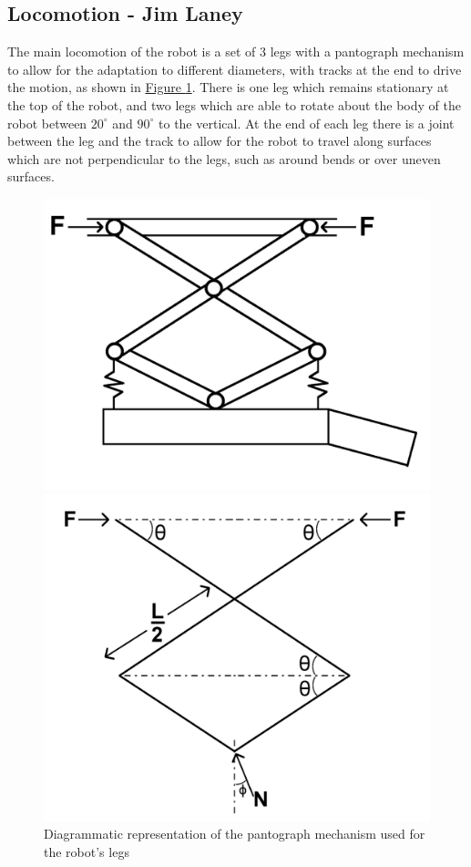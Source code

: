 \documentclass[11pt]{article}		%
\newlength{\imageheight}	 %
\newcommand{\figref}[1]{\hyperref[#1]{Figure \ref*{#1}}}    %
\begin{document}
		\subsection[Locomotion]{Locomotion - Jim Laney}
			The main locomotion of the robot is a set of 3 legs with a pantograph mechanism  to allow for the adaptation to different diameters, with tracks at the end to drive the motion, as shown in \figref{legDesign}.
			There is one leg which remains stationary at the top of the robot, and two legs which are able to rotate about the body of the robot between $20^\circ$ and $90^\circ$ to the vertical.
			At the end of each leg there is a joint between the leg and the track to allow for the robot to travel along surfaces which are not perpendicular to the legs, such as around bends or over uneven surfaces.
			\begin{figure}[h]
				\centering
				\begin{multicols}{2}
					\includegraphics[height=\imageheight]{legDesign}
					\caption{Diagrammatic representation of the pantograph mechanism used for the robot's legs}
					\label{legDesign}
					\columnbreak
					\includegraphics[height=\imageheight]{legDiagram}

\end{multicols}
\end{figure}
\end{document}
